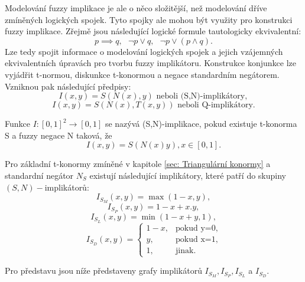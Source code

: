Modelov\'an\'i fuzzy implikace je ale o něco složitější, než modelov\'an\'i dříve zmíněných logických spojek. Tyto spojky ale mohou být využity pro konstrukci fuzzy implikace. Zřejmě jsou následující logické formule tautologicky ekvivalentní: $$ p\implies q, \mbox{   } \neg p \vee q, \mbox{   } \neg p\vee (p\wedge q) .$$ Lze tedy spojit informace o modelov\'an\'i logických spojek a jejich vzájemných ekvivalentních \' upravách pro tvorbu fuzzy implikátoru. Konstrukce konjunkce lze vyjádřit t-normou, diskunkce t-konormou a negace standardn\'im negátorem. Vzniknou pak n\'asleduj\'ic\'i p\v redpisy:
$$I(x,y)=S(N(x),y)\text{ neboli (S,N)-implikátory},$$
$$I(x,y)=S(N(x),T(x,y)) \text{ neboli Q-implikátory}.$$

\begin{definition}
    \cite{Springer}
    Funkce $I: [0,1]^2 \rightarrow [0,1]$ se nazývá (S,N)-implikace, pokud existuje t-konorma S a fuzzy negace N taková, že $$I(x,y) = S(N(x)y), x \in [0,1].$$
\end{definition}

\begin{example}
\cite{Springer}
Pro základní t-konormy zmíněné v kapitole \ref{sec: Triangulární konormy} a standardní negátor $N_S$ existují následující implikátory, které patří do skupiny $(S,N)-$implikátor\r u:\\
    \vbox{$$ I_{S_M}(x,y)=\max(1-x,y),$$ }
\vbox{$$ I_{S_P}(x,y)=1-x+x.y,$$}
 \vbox{$$ I_{S_L}(x,y)=\min(1-x+y,1),$$}
 $$ I_{S_D}(x,y)=\begin{cases} 1-x,
&\mbox {pokud y=0,} \\y, &\mbox {pokud x=1}, \\
1, &\mbox {jinak.} \end{cases} $$
\end{example}

Pro představu jsou níže představeny grafy implikátorů $I_{S_M}, I_{S_P}, I_{S_L}$ a $I_{S_D}.$


